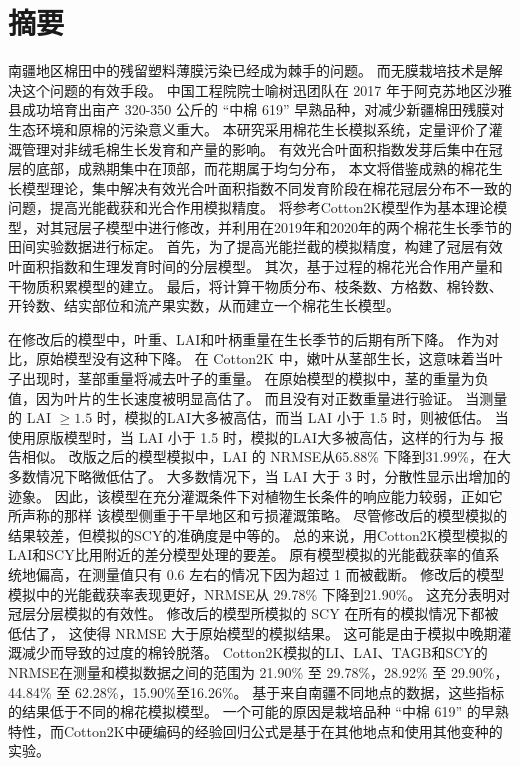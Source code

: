\chapter*{摘要}
南疆地区棉田中的残留塑料薄膜污染已经成为棘手的问题。%
而无膜栽培技术是解决这个问题的有效手段。%
中国工程院院士喻树迅团队在 2017 年于阿克苏地区沙雅县成功培育出亩产 320{-}350 公斤的 “中棉 619” 早熟品种，对减少新疆棉田残膜对生态环境和原棉的污染意义重大。%
本研究采用棉花生长模拟系统，定量评价了灌溉管理对非绒毛棉生长发育和产量的影响。%
有效光合叶面积指数发芽后集中在冠层的底部，成熟期集中在顶部，而花期属于均匀分布，%
本文将借鉴成熟的棉花生长模型理论，集中解决有效光合叶面积指数不同发育阶段在棉花冠层分布不一致的问题，提高光能截获和光合作用模拟精度。
将参考Cotton2K模型作为基本理论模型，对其冠层子模型中进行修改，并利用在2019年和2020年的两个棉花生长季节的田间实验数据进行标定。
首先，为了提高光能拦截的模拟精度，构建了冠层有效叶面积指数和生理发育时间的分层模型。
其次，基于过程的棉花光合作用产量和干物质积累模型的建立。
最后，将计算干物质分布、枝条数、方格数、棉铃数、开铃数、结实部位和流产果实数，从而建立一个棉花生长模型。

在修改后的模型中，叶重、LAI和叶柄重量在生长季节的后期有所下降。
作为对比，原始模型没有这种下降。
在 Cotton2K 中，嫩叶从茎部生长，这意味着当叶子出现时，茎部重量将减去叶子的重量。
在原始模型的模拟中，茎的重量为负值，因为叶片的生长速度被明显高估了。
而且没有对正数重量进行验证。
当测量的 LAI $\ge 1.5$ 时，模拟的LAI大多被高估，而当 LAI 小于 1.5 时，则被低估。
当使用原版模型时，当 LAI 小于 1.5 时，模拟的LAI大多被高估，这样的行为与  报告相似。
改版之后的模型模拟中，LAI 的 NRMSE从65.88\% 下降到31.99\%，在大多数情况下略微低估了。
大多数情况下，当 LAI 大于 3 时，分散性显示出增加的迹象。
因此，该模型在充分灌溉条件下对植物生长条件的响应能力较弱，正如它所声称的那样
该模型侧重于干旱地区和亏损灌溉策略。
尽管修改后的模型模拟的结果较差，但模拟的SCY的准确度是中等的。
总的来说，用Cotton2K模型模拟的LAI和SCY比用附近的差分模型处理的要差。
原有模型模拟的光能截获率的值系统地偏高，在测量值只有 0.6 左右的情况下因为超过 1 而被截断。
修改后的模型模拟中的光能截获率表现更好，NRMSE从 29.78\% 下降到21.90\%。
这充分表明对冠层分层模拟的有效性。
修改后的模型所模拟的 SCY 在所有的模拟情况下都被低估了，
这使得 NRMSE 大于原始模型的模拟结果。
这可能是由于模拟中晚期灌溉减少而导致的过度的棉铃脱落。
Cotton2K模拟的LI、LAI、TAGB和SCY的NRMSE在测量和模拟数据之间的范围为
21.90\% 至 29.78\%，28.92\% 至 29.90\%，44.84\% 至 62.28\%，15.90\%至16.26\%。
基于来自南疆不同地点的数据，这些指标的结果低于不同的棉花模拟模型。
一个可能的原因是栽培品种 “中棉 619” 的早熟特性，而Cotton2K中硬编码的经验回归公式是基于在其他地点和使用其他变种的实验。

